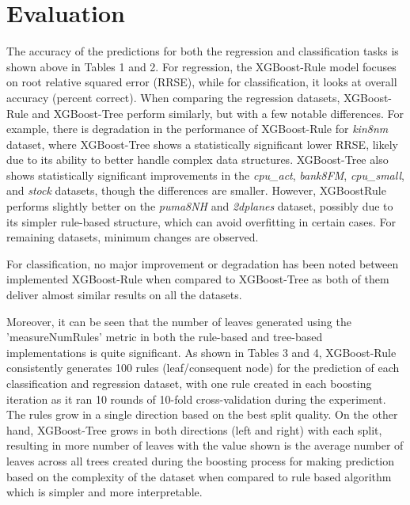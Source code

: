 \documentclass{article}
\begin{document}
\section{Evaluation}
The accuracy of the predictions for both the regression and classification tasks is shown above in Tables 1 and 2. For regression, the XGBoost-Rule model focuses on root relative squared error (RRSE), while for classification, it looks at overall accuracy (percent correct). When comparing the regression datasets, XGBoost-Rule and XGBoost-Tree perform similarly, but with a few notable differences. For example, there is degradation in the performance of XGBoost-Rule for \textit{kin8nm} dataset, where XGBoost-Tree shows a statistically significant lower RRSE, likely due to its ability to better handle complex data structures. XGBoost-Tree also shows statistically significant improvements in the \textit{cpu\_act}, \textit{bank8FM}, \textit{cpu\_small}, and \textit{stock} datasets, though the differences are smaller. However, XGBoostRule performs slightly better on the \textit{puma8NH} and \textit{2dplanes} dataset, possibly due to its simpler rule-based structure, which can avoid overfitting in certain cases. For remaining datasets, minimum changes are observed. 

For classification, no major improvement or degradation has been noted between implemented XGBoost-Rule when compared to XGBoost-Tree as both of them deliver almost similar results on all the datasets.

Moreover, it can be seen that the number of leaves generated using the 'measureNumRules' metric in both the rule-based and tree-based implementations is quite significant. As shown in Tables 3 and 4, XGBoost-Rule consistently generates 100 rules (leaf/consequent node) for the prediction of each classification and regression dataset, with one rule created in each boosting iteration as it ran 10 rounds of 10-fold cross-validation during the experiment. The rules grow in a single direction based on the best split quality. On the other hand, XGBoost-Tree grows in both directions (left and right) with each split, resulting in more number of leaves with the value shown is the average number of leaves across all trees created during the boosting process for making prediction based on the complexity of the dataset when compared to rule based algorithm which is simpler and more interpretable.
\end{document}
